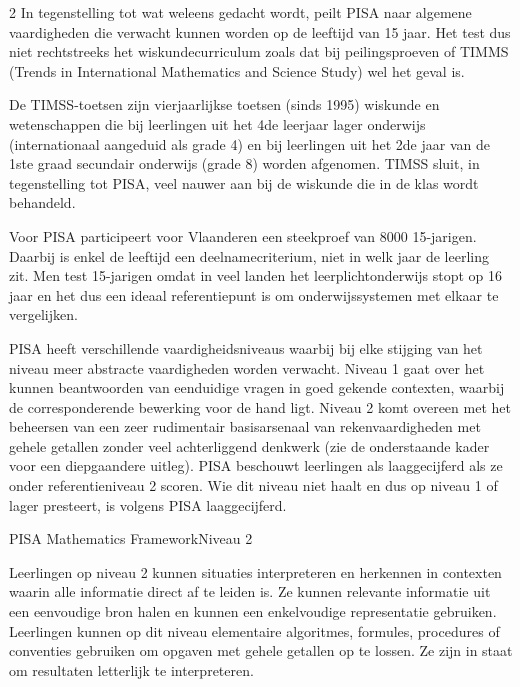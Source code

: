 \begin{multicols}{2}
In tegenstelling tot wat weleens gedacht wordt, peilt PISA naar algemene vaardigheden die verwacht kunnen worden op de leeftijd van 15 jaar. Het test dus niet rechtstreeks het wiskundecurriculum zoals dat bij peilingsproeven of TIMMS (Trends in International Mathematics and Science Study) wel het geval is. 

De TIMSS-toetsen zijn vierjaarlijkse toetsen (sinds 1995) wiskunde en wetenschappen die bij leerlingen uit het 4de leerjaar lager onderwijs (internationaal aangeduid als grade 4) en bij leerlingen uit het 2de jaar van de 1ste graad secundair onderwijs (grade 8) worden afgenomen. TIMSS sluit, in tegenstelling tot PISA, veel nauwer aan bij de wiskunde die in de klas wordt behandeld. 

Voor PISA participeert voor Vlaanderen een steekproef van 8000 15-jarigen. Daarbij is enkel de leeftijd een deelnamecriterium, niet in welk jaar de leerling zit. Men test 15-jarigen omdat in veel landen het leerplichtonderwijs stopt op 16 jaar en het dus een ideaal referentiepunt is om onderwijssystemen met elkaar te vergelijken. 

PISA heeft verschillende vaardigheidsniveaus waarbij bij elke stijging van het niveau meer abstracte vaardigheden worden verwacht. Niveau 1 gaat over het kunnen beantwoorden van eenduidige vragen in goed gekende contexten, waarbij de corresponderende bewerking voor de hand ligt. Niveau 2 komt overeen met het beheersen van een zeer rudimentair basisarsenaal van rekenvaardigheden met gehele getallen zonder veel achterliggend denkwerk (zie de onderstaande kader voor een diepgaandere uitleg). PISA beschouwt leerlingen als laaggecijferd als ze onder referentieniveau 2 scoren. Wie dit niveau niet haalt en dus op niveau 1 of lager presteert, is volgens PISA laaggecijferd.   

\begin{kader}{PISA Mathematics Framework}{Niveau 2}

Leerlingen op niveau 2 kunnen situaties interpreteren en herkennen in
contexten waarin alle informatie direct af te leiden is. Ze kunnen
relevante informatie uit een eenvoudige bron halen en kunnen een
enkelvoudige representatie gebruiken. Leerlingen kunnen op dit niveau
elementaire algoritmes, formules, procedures of conventies gebruiken om
opgaven met gehele getallen op te lossen. Ze zijn in staat om resultaten letterlijk te interpreteren. 
	\end{kader}
	


\end{multicols}
